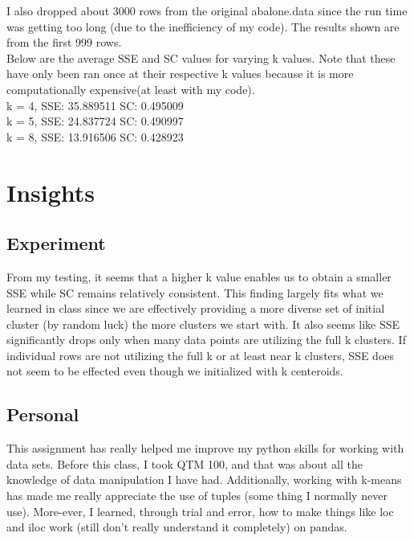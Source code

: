 \documentclass{article}
\begin{document}
\noindent
I also dropped about 3000 rows from the original abalone.data since the run time was getting too long (due to the inefficiency of my code). The results shown are from the first 999 rows.\\

\noindent
Below are the average SSE and SC values for varying k values. Note that these have only been ran once at their respective k values because it is more computationally expensive(at least with my code).\\
\noindent
k = 4,  SSE: 35.889511 	 SC: 0.495009 \\
k = 5,  SSE: 24.837724 	 SC: 0.490997 \\
k = 8, SSE: 13.916506 	 SC: 0.428923 \\


\section{Insights}
\subsection{Experiment}
From my testing, it seems that a higher k value enables us to obtain a smaller SSE while SC remains relatively consistent. This finding largely fits what we learned in class since we are effectively providing a more diverse set of initial cluster (by random luck) the more clusters we start with. It also seems like SSE significantly drops only when many data points are utilizing the full k clusters. If individual rows are not utilizing the full k or at least near k clusters, SSE does not seem to be effected even though we initialized with k centeroids.
\subsection{Personal}
This assignment has really helped me improve my python skills for working with data sets. Before this class, I took QTM 100, and that was about all the knowledge of data manipulation I have had. Additionally, working with k-means has made me really appreciate the use of tuples (some thing I normally never use). More-ever, I learned, through trial and error, how to make things like loc and iloc work (still don't really understand it completely) on pandas. 
\end{document}

